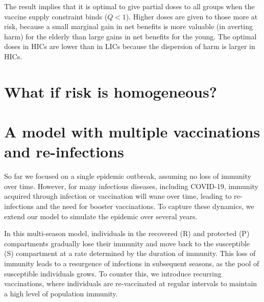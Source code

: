 \documentclass[12pt]{article}
\begin{document}
The result implies that it is optimal to give partial doses to all groups when the vaccine supply constraint binds ($Q<1$). Higher doses are given to those more at risk, because a small marginal gain in net benefits is more valuable (in averting harm) for the elderly than large gains in net benefits for the young. The optimal doses in HICs are lower than in LICs because the dispersion of harm is larger in HICs.


\section{What if risk is homogeneous?}


\section{A model with multiple vaccinations and re-infections}

So far we focused on a single epidemic outbreak, assuming no loss of immunity over time. However, for many infectious diseases, including COVID-19, immunity acquired through infection or vaccination will wane over time, leading to re-infections and the need for booster vaccinations. To capture these dynamics, we extend our model to simulate the epidemic over several years.

In this multi-season model, individuals in the recovered (R) and protected (P) compartments gradually lose their immunity and move back to the susceptible (S) compartment at a rate determined by the duration of immunity. This loss of immunity leads to a resurgence of infections in subsequent seasons, as the pool of susceptible individuals grows. To counter this, we introduce recurring vaccinations, where individuals are re-vaccinated at regular intervals to maintain a high level of population immunity.


\end{document}
